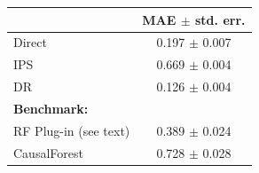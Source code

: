 \begin{tabular}{p{3cm} c} 
\toprule 
 & MAE $\pm$ std. err. \\ 
\midrule 
Direct & 0.197 $\pm$ 0.007 \\
IPS & 0.669 $\pm$ 0.004 \\
DR & 0.126 $\bm\pm$ 0.004 \\
\midrule 
\multicolumn{2}{l}{\textbf{Benchmark:}} \\
RF Plug-in (see text) & 0.389 $\pm$ 0.024 \\
CausalForest \citep{athey2019generalized} & \multirow{2}{*}{0.728 $\pm$ 0.028} \\
\bottomrule 
 \end{tabular}